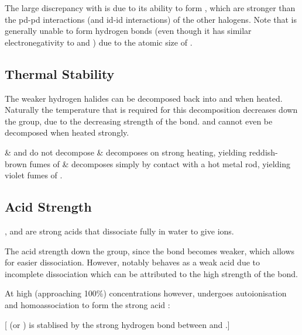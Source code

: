 			The large discrepancy with  is due to its ability to form , which are stronger than the pd-pd interactions
			(and id-id interactions) of the other halogens. Note that  is generally unable to form hydrogen bonds (even though it has
			similar electronegativity to  and ) due to the atomic size of \ch{\Cl}.




		\subsection{Thermal Stability}

			The weaker hydrogen halides can be decomposed back into  and  when heated. Naturally the temperature that is required
			for this decomposition decreases down the group, due to the decreasing strength of the  bond.
			 and  cannot even be decomposed when heated strongly.

			\begin{bulletlist}
				&  and  do not decompose
				&  decomposes on strong heating, yielding reddish-brown fumes of 
				&  decomposes simply by contact with a hot metal rod, yielding violet fumes of .
			\end{bulletlist}



		\subsection{Acid Strength}

			,  and  are strong acids that dissociate fully in water to give  ions.

			The acid strength  down the group, since the  bond becomes weaker, which allows for easier
			dissociation. However,  notably behaves as a weak acid due to incomplete dissociation which can be attributed to the
			high strength of the  bond.

			At high (approaching 100\%) concentrations however,  undergoes autoionisation and homoassociation to form the strong acid
			:

			[ (or ) is stablised by the strong hydrogen bond between  and .]

